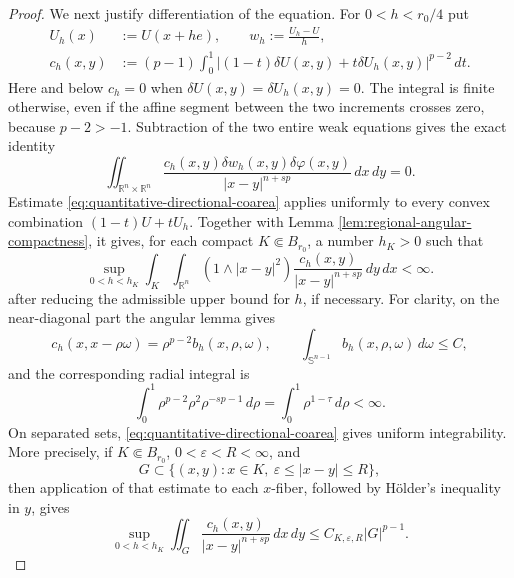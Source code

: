 \documentclass[11pt,reqno]{amsart}
\numberwithin{equation}{section}
\newcommand{\R}{\mathbb R}
\newcommand{\dd}{\,d}
\theoremstyle{remark}
\begin{document}
\begin{proof}
We next justify differentiation of the equation.  For $0<h<r_0/4$ put
\begin{align*}
 U_h(x)&:=U(x+he),\qquad w_h:=\frac{U_h-U}{h},\\
 c_h(x,y)&:=(p-1)\int_0^1
 |(1-t)\delta U(x,y)+t\delta U_h(x,y)|^{p-2}\dd t.
\end{align*}
Here and below \(c_h=0\) when
\(\delta U(x,y)=\delta U_h(x,y)=0\).  The integral is finite otherwise,
even if the affine segment between the two increments crosses zero,
because \(p-2>-1\).
Subtraction of the two entire weak equations gives the exact identity
\begin{equation}
 \iint_{\R^n\times\R^n}
 \frac{c_h(x,y)\delta w_h(x,y)\delta\varphi(x,y)}
 {|x-y|^{n+sp}}\dd x\!\dd y=0.
 \label{eq:exact-secant-linear-equation}
\end{equation}
Estimate \eqref{eq:quantitative-directional-coarea} applies uniformly
to every convex combination \((1-t)U+tU_h\).  Together with Lemma
\ref{lem:regional-angular-compactness}, it gives, for each compact
\(K\Subset B_{r_0}\), a number \(h_K>0\) such that
\begin{equation}
 \sup_{0<h<h_K}
 \int_K\int_{\R^n}(1\wedge|x-y|^2)
 \frac{c_h(x,y)}{|x-y|^{n+sp}}\dd y\!\dd x<\infty.
 \label{eq:averaged-secant-levy-bound}
\end{equation}
after reducing the admissible upper bound for \(h\), if necessary.
For clarity, on the near-diagonal part the angular lemma gives
\[
 c_h(x,x-\rho\omega)=\rho^{p-2}b_h(x,\rho,\omega),
 \qquad
 \int_{\mathbb S^{n-1}}b_h(x,\rho,\omega)\dd\omega\le C,
\]
and the corresponding radial integral is
\[
 \int_0^1\rho^{p-2}\rho^2\rho^{-sp-1}\dd\rho
 =\int_0^1\rho^{1-\tau}\dd\rho<\infty.
\]
On separated sets,
\eqref{eq:quantitative-directional-coarea} gives uniform
integrability.  More precisely, if \(K\Subset B_{r_0}\),
\(0<\varepsilon<R<\infty\), and
\[
 G\subset\{(x,y):x\in K,\ \varepsilon\le|x-y|\le R\},
\]
then application of that estimate to each \(x\)-fiber, followed by
H\"older's inequality in \(y\), gives
\begin{equation}
 \sup_{0<h<h_K}\iint_G
 \frac{c_h(x,y)}{|x-y|^{n+sp}}\dd x\!\dd y
 \le C_{K,\varepsilon,R}|G|^{p-1}.
 \label{eq:separated-secant-uniform-integrability}
\end{equation}


\end{proof}
\end{document}

